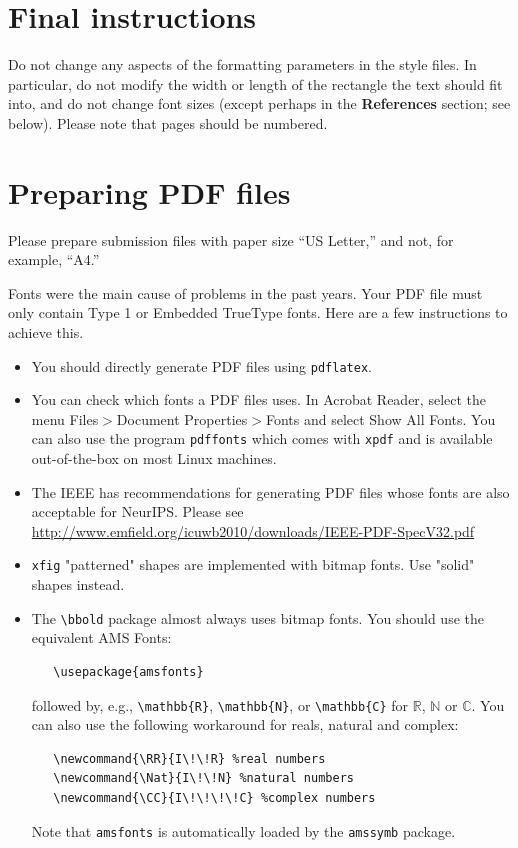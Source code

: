\documentclass{article}
\begin{document}
\section{Final instructions}

Do not change any aspects of the formatting parameters in the style files.  In
particular, do not modify the width or length of the rectangle the text should
fit into, and do not change font sizes (except perhaps in the
\textbf{References} section; see below). Please note that pages should be
numbered.

\section{Preparing PDF files}

Please prepare submission files with paper size ``US Letter,'' and not, for
example, ``A4.''

Fonts were the main cause of problems in the past years. Your PDF file must only
contain Type 1 or Embedded TrueType fonts. Here are a few instructions to
achieve this.

\begin{itemize}

\item You should directly generate PDF files using \verb+pdflatex+.

\item You can check which fonts a PDF files uses.  In Acrobat Reader, select the
  menu Files$>$Document Properties$>$Fonts and select Show All Fonts. You can
  also use the program \verb+pdffonts+ which comes with \verb+xpdf+ and is
  available out-of-the-box on most Linux machines.

\item The IEEE has recommendations for generating PDF files whose fonts are also
  acceptable for NeurIPS. Please see
  \url{http://www.emfield.org/icuwb2010/downloads/IEEE-PDF-SpecV32.pdf}

\item \verb+xfig+ "patterned" shapes are implemented with bitmap fonts.  Use
  "solid" shapes instead.

\item The \verb+\bbold+ package almost always uses bitmap fonts.  You should use
  the equivalent AMS Fonts:
\begin{verbatim}
   \usepackage{amsfonts}
\end{verbatim}
followed by, e.g., \verb+\mathbb{R}+, \verb+\mathbb{N}+, or \verb+\mathbb{C}+
for $\mathbb{R}$, $\mathbb{N}$ or $\mathbb{C}$.  You can also use the following
workaround for reals, natural and complex:
\begin{verbatim}
   \newcommand{\RR}{I\!\!R} %real numbers
   \newcommand{\Nat}{I\!\!N} %natural numbers
   \newcommand{\CC}{I\!\!\!\!C} %complex numbers
\end{verbatim}
Note that \verb+amsfonts+ is automatically loaded by the \verb+amssymb+ package.

\end{itemize}
\end{document}
